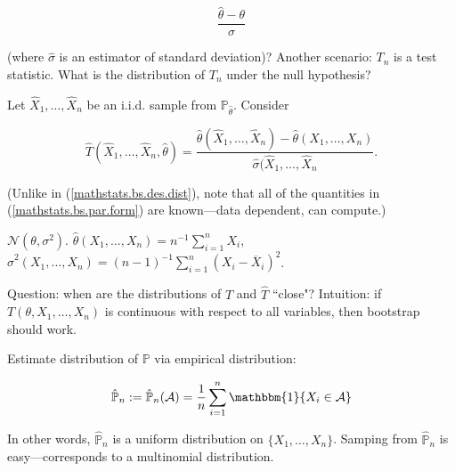\begin{equation}\label{mathstats.bs.des.dist}
\frac{\hat{\theta} - \theta}{\hat{\sigma}}
\end{equation}

 (where \(\hat{\sigma}\) is an estimator of standard deviation)? Another scenario: \(T_n\) is a test statistic. What is the distribution of \(T_n\) under the null hypothesis?

\begin{definition}

Let \(\hat{X}_1, \ldots, \hat{X}_n\) be an i.i.d. sample from \(\mathbb{P}_{\hat{\theta}}\). Consider 

\begin{equation}\label{mathstats.bs.par.form}
\hat{T}(\hat{X}_1, \ldots, \hat{X}_n, \hat{\theta}) = \frac{\hat{\theta}(\hat{X}_1, \ldots, \hat{X}_n) - \hat{\theta}(X_1, \ldots, X_n)}{\hat{\sigma}(\hat{X}_1, \ldots, \hat{X}_n}.
\end{equation}

(Unlike in (\ref{mathstats.bs.des.dist}), note that all of the quantities in (\ref{mathstats.bs.par.form}) are known---data dependent, can compute.)

\end{definition}

\begin{example}

 \(\mathcal{N}(\theta, \sigma^2)\). \(\hat{\theta}(X_1, \ldots, X_n)= n^{-1} \sum_{i=1}^n X_i\), \(\hat{\sigma}^2(X_1, \ldots, X_n) = (n-1)^{-1} \sum_{i=1}^n (X_i - \overline{X}_i)^2\). 


\end{example}

Question: when are the distributions of \(T\) and \(\hat{T}\) ``close"? Intuition: if \(T(\theta, X_1, \ldots, X_n)\) is continuous with respect to all variables, then bootstrap should work.

\begin{definition}

Estimate distribution of \(\mathbb{P}\) via empirical distribution:

\[
\hat{\mathbb{P}}_n := \hat{\mathbb{P}}_n(\mathcal{A})  =  \frac{1}{n} \sum_{i=1}^n \mathbbm{1}\{X_i \in \mathcal{A}\} 
\]

In other words, \(\hat{\mathbb{P}}_n \) is a uniform distribution on \(\{X_1, \ldots, X_n\}\). Samping from \(\hat{\mathbb{P}}_n \) is easy---corresponds to a multinomial distribution.

\end{definition}

